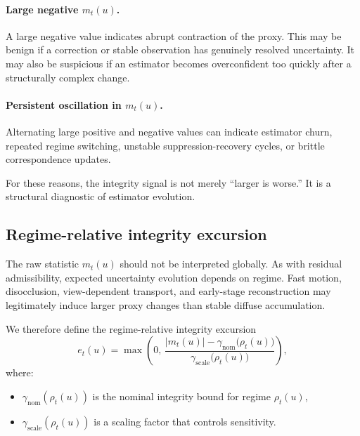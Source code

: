 \documentclass[11pt]{article}
\theoremstyle{definition}
\theoremstyle{plain}
\begin{document}
\paragraph{Large negative $m_t(u)$.}
A large negative value indicates abrupt contraction of the proxy. This may be benign if a correction or stable observation has genuinely resolved uncertainty. It may also be suspicious if an estimator becomes overconfident too quickly after a structurally complex change.

\paragraph{Persistent oscillation in $m_t(u)$.}
Alternating large positive and negative values can indicate estimator churn, repeated regime switching, unstable suppression-recovery cycles, or brittle correspondence updates.

For these reasons, the integrity signal is not merely “larger is worse.” It is a structural diagnostic of estimator evolution.


\subsection{Regime-relative integrity excursion}

The raw statistic $m_t(u)$ should not be interpreted globally. As with residual admissibility, expected uncertainty evolution depends on regime. Fast motion, disocclusion, view-dependent transport, and early-stage reconstruction may legitimately induce larger proxy changes than stable diffuse accumulation.

We therefore define the regime-relative integrity excursion
\begin{equation}
e_t(u)=
\max\!\left(
0,\,
\frac{|m_t(u)|-\gamma_{\mathrm{nom}}\bigl(\rho_t(u)\bigr)}
{\gamma_{\mathrm{scale}}\bigl(\rho_t(u)\bigr)}
\right),
\end{equation}
where:
\begin{itemize}[leftmargin=1.5em]
    \item $\gamma_{\mathrm{nom}}(\rho_t(u))$ is the nominal integrity bound for regime $\rho_t(u)$,
    \item $\gamma_{\mathrm{scale}}(\rho_t(u))$ is a scaling factor that controls sensitivity.
\end{itemize}
\end{document}
